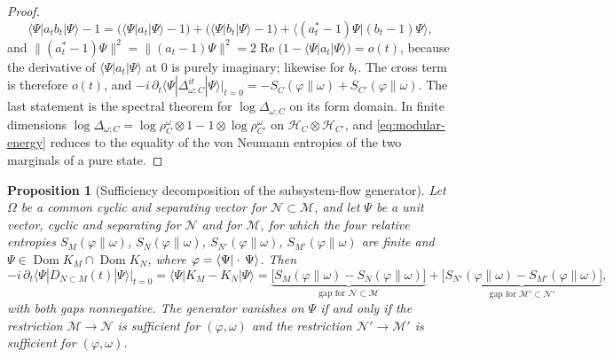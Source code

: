 \documentclass[a4paper,11pt]{article}
\newtheorem{proposition}[theorem]{Proposition}
\theoremstyle{definition}
\begin{document}
\begin{proof}
\begin{equation}
 \langle\Psi|a_tb_t|\Psi\rangle-1
 =\bigl(\langle\Psi|a_t|\Psi\rangle-1\bigr)+\bigl(\langle\Psi|b_t|\Psi\rangle-1\bigr)
 +\langle(a_t^*-1)\Psi|(b_t-1)\Psi\rangle,
\end{equation}
and $\|(a_t^*-1)\Psi\|^2=\|(a_t-1)\Psi\|^2=2\operatorname{Re}\bigl(1-\langle\Psi|a_t|\Psi\rangle\bigr)=o(t)$, because the derivative of $\langle\Psi|a_t|\Psi\rangle$ at $0$ is purely imaginary; likewise for $b_t$. The cross term is therefore $o(t)$, and
$-i\,\partial_t\langle\Psi|\Delta_{\omega;C}^{it}|\Psi\rangle|_{t=0}=-S_C(\varphi\|\omega)+S_{C'}(\varphi\|\omega)$. The last statement is the spectral theorem for $\log\Delta_{\omega;C}$ on its form domain. In finite dimensions $\log\Delta_{\omega;C}=\log\rho^\omega_{C}\otimes1-1\otimes\log\rho^\omega_{C'}$ on $\mathcal H_C\otimes\mathcal H_{C'}$, and \eqref{eq:modular-energy} reduces to the equality of the von Neumann entropies of the two marginals of a pure state.
\end{proof}

\begin{proposition}[Sufficiency decomposition of the subsystem-flow generator]\label{prop:sufficiency}
Let $\Omega$ be a common cyclic and separating vector for $\mathcal N\subset\mathcal M$, and let $\Psi$ be a unit vector, cyclic and separating for $\mathcal N$ and for $\mathcal M$, for which the four relative entropies $S_M(\varphi\|\omega)$, $S_N(\varphi\|\omega)$, $S_{N'}(\varphi\|\omega)$, $S_{M'}(\varphi\|\omega)$ are finite and $\Psi\in\operatorname{Dom}K_M\cap\operatorname{Dom}K_N$, where $\varphi=\braket{\Psi|\cdot\,\Psi}$. Then
\begin{equation}
 -i\,\partial_t\langle\Psi|D_{N\subset M}(t)|\Psi\rangle\big|_{t=0}
 =\langle\Psi|K_M-K_N|\Psi\rangle
 =\underbrace{\bigl[S_M(\varphi\|\omega)-S_N(\varphi\|\omega)\bigr]}_{\text{gap for }\mathcal N\subset\mathcal M}
 +\underbrace{\bigl[S_{N'}(\varphi\|\omega)-S_{M'}(\varphi\|\omega)\bigr]}_{\text{gap for }\mathcal M'\subset\mathcal N'} ,
 \label{eq:sufficiency-decomposition}
\end{equation}
with both gaps nonnegative. The generator vanishes on $\Psi$ if and only if the restriction $\mathcal M\to\mathcal N$ is sufficient for $(\varphi,\omega)$ and the restriction $\mathcal N'\to\mathcal M'$ is sufficient for $(\varphi,\omega)$.
\end{proposition}
\end{document}
